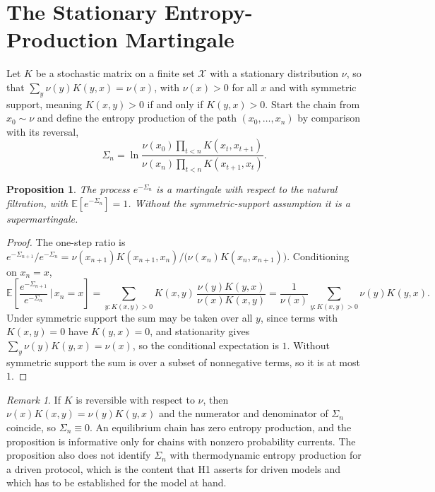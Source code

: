\documentclass[11pt]{article}
\newtheorem{proposition}{Proposition}
\theoremstyle{definition}
\theoremstyle{remark}
\newtheorem{remark}{Remark}
\newcommand{\E}{\mathbb{E}}
\begin{document}
\section{The Stationary Entropy-Production Martingale}\label{app:stationary}

Let $K$ be a stochastic matrix on a finite set $\mathcal{X}$ with a stationary distribution $\nu$, so that $\sum_y \nu(y) K(y,x) = \nu(x)$, with $\nu(x) > 0$ for all $x$ and with symmetric support, meaning $K(x,y) > 0$ if and only if $K(y,x) > 0$. Start the chain from $x_0 \sim \nu$ and define the entropy production of the path $(x_0, \dots, x_n)$ by comparison with its reversal,
\[
\Sigma_n = \ln \frac{\nu(x_0) \prod_{t<n} K(x_t, x_{t+1})}{\nu(x_n) \prod_{t<n} K(x_{t+1}, x_t)} .
\]

\begin{proposition}\label{prop:stationary}
The process $e^{-\Sigma_n}$ is a martingale with respect to the natural filtration, with $\E[e^{-\Sigma_n}] = 1$. Without the symmetric-support assumption it is a supermartingale.
\end{proposition}

\begin{proof}
The one-step ratio is $e^{-\Sigma_{n+1}}/e^{-\Sigma_n} = \nu(x_{n+1}) K(x_{n+1}, x_n) / \big(\nu(x_n) K(x_n, x_{n+1})\big)$. Conditioning on $x_n = x$,
\[
\E\!\left[\frac{e^{-\Sigma_{n+1}}}{e^{-\Sigma_n}} \,\Big|\, x_n = x\right] = \sum_{y : K(x,y) > 0} K(x,y)\, \frac{\nu(y) K(y,x)}{\nu(x) K(x,y)} = \frac{1}{\nu(x)} \sum_{y : K(x,y) > 0} \nu(y) K(y,x) .
\]
Under symmetric support the sum may be taken over all $y$, since terms with $K(x,y) = 0$ have $K(y,x) = 0$, and stationarity gives $\sum_y \nu(y) K(y,x) = \nu(x)$, so the conditional expectation is $1$. Without symmetric support the sum is over a subset of nonnegative terms, so it is at most $1$.
\end{proof}

\begin{remark}
If $K$ is reversible with respect to $\nu$, then $\nu(x) K(x,y) = \nu(y) K(y,x)$ and the numerator and denominator of $\Sigma_n$ coincide, so $\Sigma_n \equiv 0$. An equilibrium chain has zero entropy production, and the proposition is informative only for chains with nonzero probability currents. The proposition also does not identify $\Sigma_n$ with thermodynamic entropy production for a driven protocol, which is the content that H1 asserts for driven models and which has to be established for the model at hand.
\end{remark}
\end{document}
